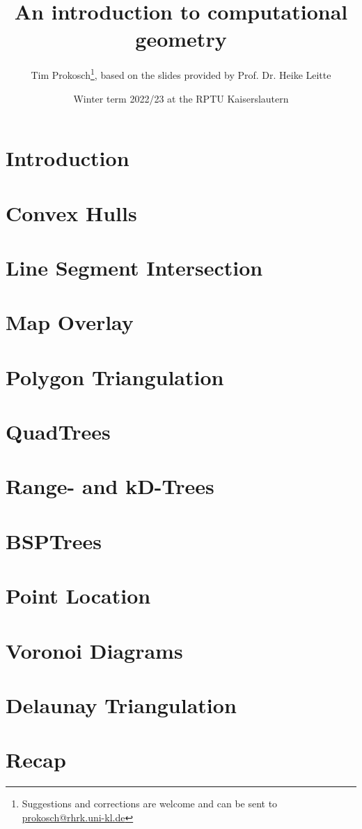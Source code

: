 \documentclass[a4paper, 12pt]{report}
\title{An introduction to computational geometry}
\author{Tim Prokosch\footnote{Suggestions and corrections are welcome and can be sent to \href{mailto:prokosch@rhrk.uni-kl.de}{prokosch@rhrk.uni-kl.de}}, based on the slides provided by Prof. Dr. Heike Leitte}
\date{Winter term 2022/23 at the RPTU Kaiserslautern}
\begin{document}
  \maketitle
  \tableofcontents
  \listofalgorithms

  \chapter{Introduction}
  

  \chapter{Convex Hulls}
  \label{ch:convex_hulls}
  

  \chapter{Line Segment Intersection}
  \label{ch:line_segment_intersection}
  

  \chapter{Map Overlay}
  \label{ch:map_overlay}
  

  \chapter{Polygon Triangulation}
  \label{ch:polygon_triangulation}
  

  \chapter{QuadTrees}
  \label{ch:quadtrees}
  

  \chapter{Range- and kD-Trees}
  \label{ch:range-_and_kd-trees}
  

  \chapter{BSPTrees}
  \label{ch:bsptrees}
  

  \chapter{Point Location}
  \label{ch:point_location}
  

  \chapter{Voronoi Diagrams}
  \label{ch:voronoi_diagrams}
  

  \chapter{Delaunay Triangulation}
  \label{ch:delaunay_triangulation}
  

  \chapter{Recap}
  
\end{document}
